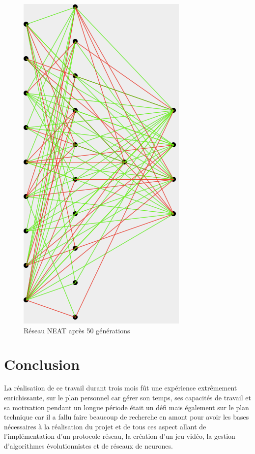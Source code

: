 \documentclass{article}
\begin{document}
\begin{figure}[H]
\begin{center}
	\includegraphics[scale=0.45]{neatevolv.png}
	\caption{Réseau NEAT après 50 générations}
\end{center}
\end{figure}

\newpage
\section{Conclusion}

La réalisation de ce travail durant trois mois fût une expérience extrêmement enrichissante, sur le plan personnel car gérer son temps, ses capacités de travail et sa motivation pendant un longue période était un défi mais également sur le plan technique car il a fallu faire beaucoup de recherche en amont pour avoir les bases nécessaires à la réalisation du projet et de tous ces aspect allant de l'implémentation d'un protocole réseau, la création d'un jeu vidéo, la gestion d'algorithmes évolutionnistes et de réseaux de neurones.\\
\end{document}
